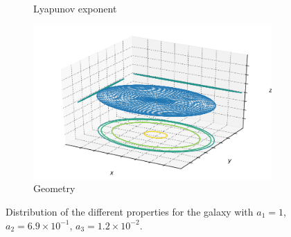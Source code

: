 \begin{figure}[h]
\begin{subfigure}[t]{0.4\textwidth}
        \caption{Lyapunov exponent}
    \end{subfigure}
    \begin{subfigure}[t]{0.4\textwidth}
        \includegraphics[width=\textwidth]{"../Files/Week 13/images/3_ellipsoid"}
        \caption{Geometry}
    \end{subfigure}
    \caption{Distribution of the different properties for the galaxy with $a_1 = 1$, $a_2 = 6.9\times10^{-1}$, $a_3 = 1.2\times10^{-2}$.}
\end{figure}


